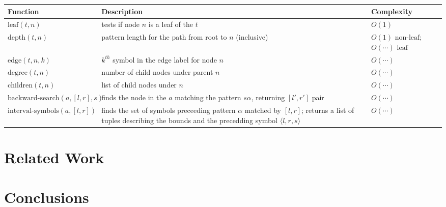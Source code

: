 \documentclass[11pt,a4paper]{article}
\newcommand*\CSA{\textsc{Csa}\xspace}
\newcommand*\CST{\textsc{Cst}\xspace}
\newcommand{\leaf}[2]{\text{leaf}(#1, #2)}
\newcommand{\depth}[2]{\text{depth}(#1, #2)}
\newcommand{\degree}[2]{\text{degree}(#1, #2)}
\newcommand{\edge}[3]{\text{edge}(#1, #2, #3)}
\newcommand{\children}[2]{\text{children}(#1, #2)}
\newcommand{\backwardsearch}[4]{\text{backward-search}(#1, [#2,#3], #4)}
\newcommand{\forwardsearch}[4]{\text{forward-search}(#1, [#2,#3], #4)} %
\newcommand{\intervalsymbols}[3]{\text{interval-symbols}(#1, [#2,#3])}
\newcommand{\Order}[1]{O(#1)}
\begin{document}
\begin{table*}
\footnotesize
\begin{tabular}{p{}p{}p{}}
\toprule
Function & Description & Complexity \\
\midrule
$\leaf{t}{n}$ & tests if node $n$ is a leaf of the  $t$ & $\Order{1}$ \\
$\depth{t}{n}$ & pattern length for the path from root to $n$ (inclusive) & $\Order{1} \text{~non-leaf;}$ $\Order{\cdots} \text{~leaf}$\\
$\edge{t}{n}{k}$ & $k^{th}$ symbol in the edge label for node $n$ &  $\Order{\cdots}$ \\
$\degree{t}{n}$ &  number of child nodes under parent $n$  &  $\Order{\cdots}$ \\
$\children{t}{n}$ & list of child nodes under $n$  &  $\Order{\cdots}$ \\
$\backwardsearch{a}{l}{r}{s}$ & finds the node in the  $a$ matching the pattern $s \alpha$, returning $[l',r']$ pair  &  $\Order{\cdots}$ \\
$\intervalsymbols{a}{l}{r}$ & finds the set of symbols preceeding pattern $\alpha$ matched by $[l, r]$; returns a list of tuples describing the bounds and the precedding symbol $\langle l, r, s\rangle$  &  $\Order{\cdots}$ \\
\bottomrule
\end{tabular}
\caption{Summary of \CSA and \CST functions used and their time complexity of inference. The above assumes that $n$ or (equivalently) $[l, r]$ matches $\alpha$ in the \CSA $a$ and/or \CST $t$.}
\end{table*}

\section{Related Work}

\cite{brants2007large}
\cite{guthrie2010storing}
\cite{brants2006web}
\cite{stolcke2011srilm}
\cite{stolcke2002srilm}
\cite{pauls2011faster}
\cite{heafield2011kenlm}
\cite{kennington2012suffix}
\cite{wood2011sequence}
\cite{chen1996empirical}
\cite{kneser1995improved}
\cite{chen1996empirical}
\cite{navarro2007compressed}
\cite{gog2014theory}

\section{Conclusions}




\end{document}
